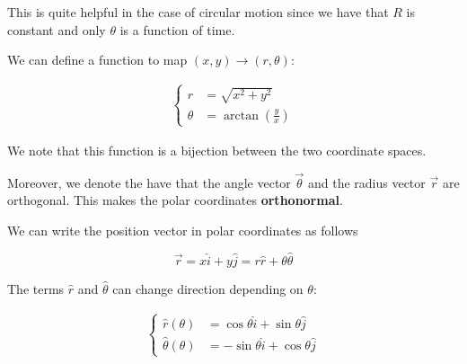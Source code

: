 \documentclass[14pt]{extarticle}
\begin{document}
This is quite helpful in the case of circular motion since we have that $R$ is constant
and only $\theta$ is a function of time.

We can define a function to map $(x, y) \to (r, \theta)$:

\begin{align*}
  \begin{cases}
    r      & = \sqrt{x^2 + y^2}                \\
    \theta & = \arctan\left(\frac{y}{x}\right)
  \end{cases}
\end{align*}

We note that this function is a bijection between the two coordinate spaces.

Moreover, we denote the have that the angle vector $\vec \theta$
and the radius vector $\vec r$ are orthogonal. This makes the polar coordinates \textbf{orthonormal}.

\begin{center}
\end{center}

We can write the position vector in polar coordinates as follows

$$
  \vec r = x \hat i + y \hat j = r \hat r + \theta \hat \theta
$$

The terms $\hat r$ and $\hat \theta$ can change direction depending on $\theta$:

\begin{align*}
  \begin{cases}
    \hat r(\theta)      & = \cos \theta \hat i + \sin \theta \hat j   \\
    \hat \theta(\theta) & = - \sin \theta \hat i + \cos \theta \hat j
  \end{cases}
\end{align*}
\end{document}
